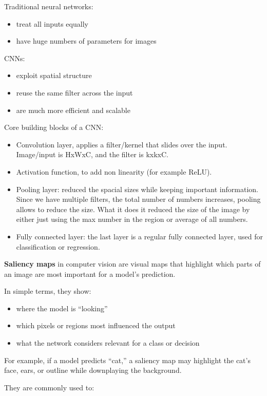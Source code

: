 \documentclass[12pt]{report}
\begin{document}
Traditional neural networks:
\begin{itemize}
  \item treat all inputs equally
  \item have huge numbers of parameters for images
\end{itemize}

CNNs:
\begin{itemize}
  \item exploit spatial structure
  \item reuse the same filter across the input
  \item are much more efficient and scalable
\end{itemize}

Core building blocks of a CNN:
\begin{itemize}
  \item Convolution layer, applies a filter/kernel that slides over the input. Image/input is HxWxC, and the filter is kxkxC.
  \item Activation function, to add non linearity (for example ReLU).
  \item Pooling layer: reduced the spacial sizes while keeping important information. Since we have multiple filters, the total number of numbers increases, pooling allows to reduce the size. What it does it reduced the size of the image by either just using the max number in the region or average of all numbers.
  \item Fully connected layer: the last layer is a regular fully connected layer, used for classification or regression.
\end{itemize}


\textbf{Saliency maps} in computer vision are visual maps that highlight which parts of an image are most important for a model’s prediction.

In simple terms, they show:
\begin{itemize}
	\item where the model is “looking”
	\item which pixels or regions most influenced the output
	\item what the network considers relevant for a class or decision
\end{itemize}

For example, if a model predicts “cat,” a saliency map may highlight the cat’s face, ears, or outline while downplaying the background.

They are commonly used to:
\end{document}
